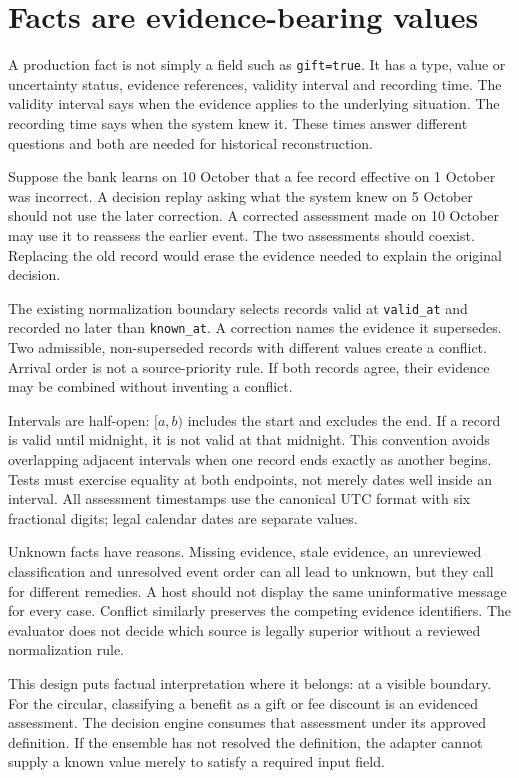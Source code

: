 \section{Facts are evidence-bearing values}

A production fact is not simply a field such as \texttt{gift=true}. It has a type,
value or uncertainty status, evidence references, validity interval and recording
time. The validity interval says when the evidence applies to the underlying
situation. The recording time says when the system knew it. These times answer
different questions and both are needed for historical reconstruction.

Suppose the bank learns on 10 October that a fee record effective on 1 October
was incorrect. A decision replay asking what the system knew on 5 October should
not use the later correction. A corrected assessment made on 10 October may use
it to reassess the earlier event. The two assessments should coexist. Replacing
the old record would erase the evidence needed to explain the original decision.

The existing normalization boundary selects records valid at \texttt{valid\_at}
and recorded no later than \texttt{known\_at}. A correction names the evidence it
supersedes. Two admissible, non-superseded records with different values create a
conflict. Arrival order is not a source-priority rule. If both records agree,
their evidence may be combined without inventing a conflict.

Intervals are half-open: $[a,b)$ includes the start and excludes the end. If a
record is valid until midnight, it is not valid at that midnight. This convention
avoids overlapping adjacent intervals when one record ends exactly as another
begins. Tests must exercise equality at both endpoints, not merely dates well
inside an interval. All assessment timestamps use the canonical UTC format with
six fractional digits; legal calendar dates are separate values.

Unknown facts have reasons. Missing evidence, stale evidence, an unreviewed
classification and unresolved event order can all lead to unknown, but they call
for different remedies. A host should not display the same uninformative message
for every case. Conflict similarly preserves the competing evidence identifiers.
The evaluator does not decide which source is legally superior without a
reviewed normalization rule.

This design puts factual interpretation where it belongs: at a visible boundary.
For the circular, classifying a benefit as a gift or fee discount is an evidenced
assessment. The decision engine consumes that assessment under its approved
definition. If the ensemble has not resolved the definition, the adapter cannot
supply a known value merely to satisfy a required input field.

